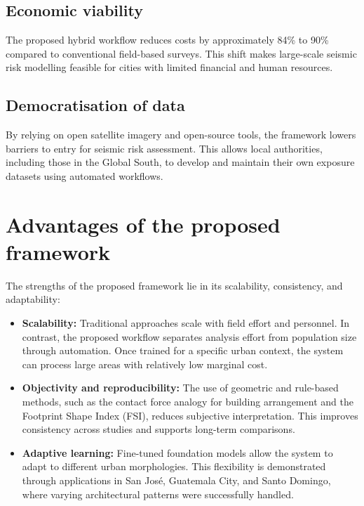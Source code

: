 \subsection*{Economic viability}
The proposed hybrid workflow reduces costs by approximately 84\% to 90\% compared to conventional field-based surveys. This shift makes large-scale seismic risk modelling feasible for cities with limited financial and human resources.

\subsection*{Democratisation of data}
By relying on open satellite imagery and open-source tools, the framework lowers barriers to entry for seismic risk assessment. This allows local authorities, including those in the Global South, to develop and maintain their own exposure datasets using automated workflows.

\renewcommand{\sectionnametext}{Advantages of the proposed framework}
\renewcommand{\headingtextR}{\thesection. \sectionnametext}
\section{\sectionnametext}

The strengths of the proposed framework lie in its scalability, consistency, and adaptability:

\begin{itemize}
    \item \textbf{Scalability:} Traditional approaches scale with field effort and personnel. In contrast, the proposed workflow separates analysis effort from population size through automation. Once trained for a specific urban context, the system can process large areas with relatively low marginal cost.

    \item \textbf{Objectivity and reproducibility:} The use of geometric and rule-based methods, such as the contact force analogy for building arrangement and the Footprint Shape Index (FSI), reduces subjective interpretation. This improves consistency across studies and supports long-term comparisons.

    \item \textbf{Adaptive learning:} Fine-tuned foundation models allow the system to adapt to different urban morphologies. This flexibility is demonstrated through applications in San José, Guatemala City, and Santo Domingo, where varying architectural patterns were successfully handled.
\end{itemize}

